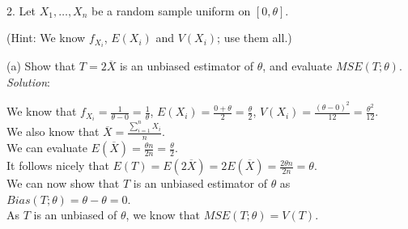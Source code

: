 \documentclass[12pt]{article}
\newcommand{\XB}{\color{black}}
\newcommand{\XBB}{\color{blue}}
\newcommand{\XV}{\color{violet}}
\begin{document}

\XBB\hrulefill\XB \\

2. Let $ X_{1},\dots,X_{n} $ be a random sample uniform on $ [0,\theta] $. 

(Hint: We know $ f_{X_{i}} $, $ E(X_{i}) $ and $ V(X_{i}) $; use them all.)

\XBB\hrulefill\XB 
\vspace{5mm} 


(a) Show that $ T = 2\overline{X} $ is an unbiased estimator of $ \theta $, and evaluate $ MSE(T; \theta) $.
\vspace{2.5mm} \\
\textit{Solution}:
\vspace{2.5mm}

\noindent 
We know that $ \displaystyle f_{X_{i}} = \frac{1}{\theta - 0} = \frac{1}{\theta} $, $ \displaystyle E(X_{i}) = \frac{0 + \theta}{2} = \frac{\theta}{2} $, $ \displaystyle V(X_{i}) = \frac{(\theta - 0)^{2}}{12} = \frac{\theta^2}{12} $. \\

\noindent 
We also know that $ \displaystyle \overline{X} = \frac{\sum_{i=1}^{n} X_{i}}{n} $. \\

\noindent 
We can evaluate $ \displaystyle E(\overline{X}) = \frac{\theta n}{2n} = \frac{\theta}{2} $. \\

\noindent 
It follows nicely that $ \displaystyle E(T) = E(2\overline{X}) = 2E(\overline{X}) = \frac{2\theta n}{2n} = \theta $. \\

\noindent 
We can now show that $ T $ is an unbiased estimator of $ \theta $ as $ Bias(T;\theta) = \theta - \theta = 0 $. \\

\noindent 
As $ T $ is an unbiased of  $ \theta $, we know that $ MSE(T; \theta) = V(T) $. \\
\end{document}
